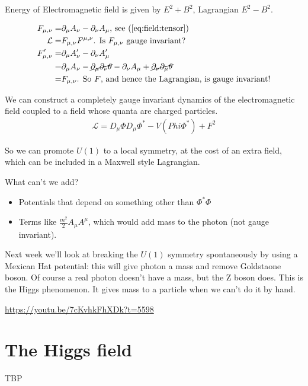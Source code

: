 \documentclass[]{article}
\begin{document}
Energy of Electromagnetic field is given by $E^2 + B^2$, Lagrangian $E^2-B^2$.

\begin{align*} 
	F_{\mu,\nu} =& \partial_\mu A_\nu - \partial_\nu A_\mu \text{, see (\ref{eq:field:tensor})}\\
	\mathcal{L} =& F_{\mu,\nu} F^{\mu,\nu} \text{. Is $F_{\mu,\nu}$ gauge invariant? }\\
	F_{\mu,\nu}^\prime =&\partial_\mu A_\nu^\prime - \partial_\nu A_\mu^\prime\\
	=& \partial_\mu A_\nu - \cancel{\partial_\mu \partial_\nu \theta}-\partial_\nu A_\mu + \cancel{\partial_\nu \partial_\mu \theta}\\
	=& 	F_{\mu,\nu} \text{. So $F$, and hence the Lagrangian, is gauge invariant!}
\end{align*}

We can construct a completely gauge invariant dynamics of the electromagnetic field coupled to a field whose quanta are charged particles.
\begin{align*}
	\mathcal{L} = D_\mu \Phi D_\mu \Phi^* -V(Phi\Phi^*) + F^2
\end{align*}

So we can promote $U(1)$ to a local symmetry, at the cost of an extra field, which can be included in a Maxwell style Lagrangian.

What can't we add?

\begin{itemize}
	\item Potentials that depend on something other than $\Phi^*\Phi$ 
	\item Terms like $\frac{m^2}{2}A_\mu A^\mu$, which would add mass to the photon (not gauge invariant).
\end{itemize}

Next week we'll look at breaking the $U(1)$ symmetry spontaneously by using a Mexican Hat potential: this will give photon a mass and remove Goldstaone boson. Of course a real photon doesn't have a mass, but the Z boson does. This is the Higgs phenomenon. It gives mass to a particle when we can't do it by hand.

\url{https://youtu.be/7cKvhkFhXDk?t=5598}
 
\section{The Higgs field}



TBP
\end{document}
